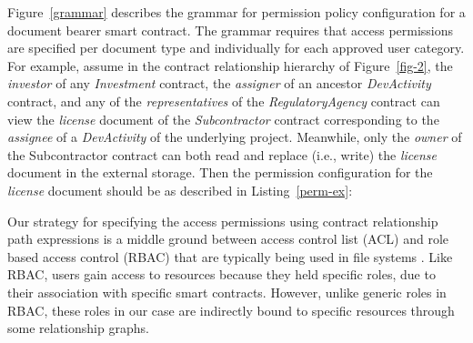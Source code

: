 \documentclass[conference]{IEEEtran}
\begin{document}
Figure~\ref{grammar} describes the grammar for permission policy configuration for a document bearer smart contract. The grammar requires that access permissions are specified per document type and individually for each approved user category. For example, assume in the contract relationship hierarchy of Figure~\ref{fig-2}, the {\it investor} of any {\it Investment} contract, the {\it assigner} of an ancestor {\it DevActivity} contract, and any of the {\it representatives} of the {\it RegulatoryAgency} contract can view the {\it license} document of the {\it Subcontractor} contract corresponding to the {\it assignee} of a {\it DevActivity} of the underlying project. Meanwhile, only the {\it owner} of the {Subcontractor} contract can both read and replace (i.e., write) the {\it license} document in the external storage. Then the permission configuration for the {\it license} document should be as described in Listing~\ref{perm-ex}:

\lstset{caption=Example access permission configuration, label=perm-ex}


Our strategy for specifying the access permissions using contract relationship path expressions is a middle ground between access control list (ACL) and role based access control (RBAC) that are typically being used in file systems \cite{Barkley:1997:CSR:266741.266769}. Like RBAC, users gain access to resources because they held specific roles, due to their association with specific smart contracts. However, unlike generic roles in RBAC, these roles in our case are indirectly bound to specific resources through some relationship graphs.       
\end{document}
